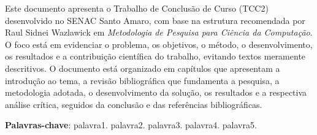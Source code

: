 \documentclass[
    12pt,                %
    openright,           %
    oneside,             %
    a4paper,             %
    english,             %
    brazil               %
]{abntex2}
\begin{document}

\frenchspacing

\pretextual

\imprimircapa

\imprimirfolhaderosto

\begin{resumo}
Este documento apresenta o Trabalho de Conclusão de Curso (TCC2) desenvolvido no SENAC Santo Amaro, com base na estrutura recomendada por Raul Sidnei Wazlawick em \textit{Metodologia de Pesquisa para Ciência da Computação}. O foco está em evidenciar o problema, os objetivos, o método, o desenvolvimento, os resultados e a contribuição científica do trabalho, evitando textos meramente descritivos. O documento está organizado em capítulos que apresentam a introdução ao tema, a revisão bibliográfica que fundamenta a pesquisa, a metodologia adotada, o desenvolvimento da solução, os resultados e a respectiva análise crítica, seguidos da conclusão e das referências bibliográficas.

\vspace{\onelineskip}

\noindent
\textbf{Palavras-chave}: palavra1. palavra2. palavra3. palavra4. palavra5.
\end{resumo}
\end{document}
